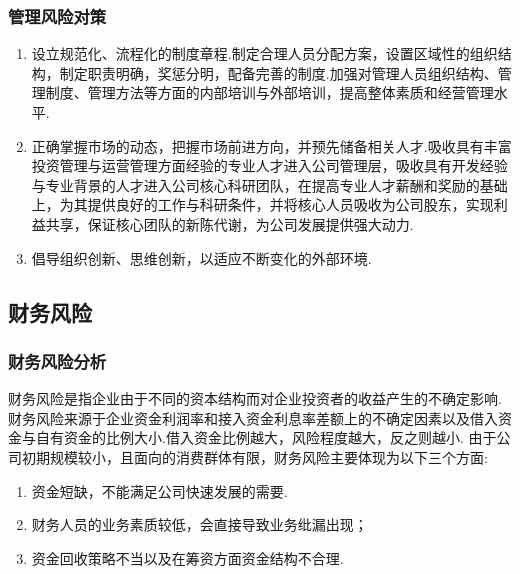\subsubsection{管理风险对策}
\begin{enumerate}
\item 设立规范化、流程化的制度章程.制定合理人员分配方案，设置区域性的组织结构，制定职责明确，奖惩分明，配备完善的制度.加强对管理人员组织结构、管理制度、管理方法等方面的内部培训与外部培训，提高整体素质和经营管理水平.

\item 正确掌握市场的动态，把握市场前进方向，并预先储备相关人才.吸收具有丰富投资管理与运营管理方面经验的专业人才进入公司管理层，吸收具有开发经验与专业背景的人才进入公司核心科研团队，在提高专业人才薪酬和奖励的基础上，为其提供良好的工作与科研条件，并将核心人员吸收为公司股东，实现利益共享，保证核心团队的新陈代谢，为公司发展提供强大动力.

\item 倡导组织创新、思维创新，以适应不断变化的外部环境.
\end{enumerate}


\subsection{财务风险}
\subsubsection{财务风险分析}
财务风险是指企业由于不同的资本结构而对企业投资者的收益产生的不确定影响.财务风险来源于企业资金利润率和接入资金利息率差额上的不确定因素以及借入资金与自有资金的比例大小.借入资金比例越大，风险程度越大，反之则越小.
由于公司初期规模较小，且面向的消费群体有限，财务风险主要体现为以下三个方面:
\begin{enumerate}
\item 资金短缺，不能满足公司快速发展的需要.
\item 财务人员的业务素质较低，会直接导致业务纰漏出现；
\item 资金回收策略不当以及在筹资方面资金结构不合理.
\end{enumerate}

